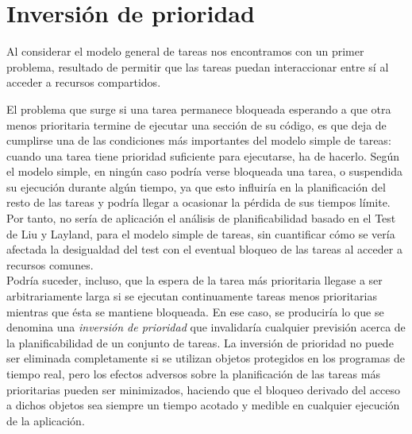 \section{Inversión de prioridad}
Al considerar el modelo general de tareas nos encontramos con un primer problema, resultado de permitir que las tareas puedan interaccionar entre sí al acceder a recursos compartidos.

El problema que surge si una tarea permanece bloqueada esperando a que otra menos prioritaria termine de ejecutar una sección de su código, es que deja de cumplirse una de las condiciones más importantes del modelo simple de tareas: cuando una tarea tiene prioridad suficiente para ejecutarse, ha de hacerlo. Según el modelo simple, en ningún caso podría verse bloqueada una tarea, o suspendida su ejecución durante algún tiempo, ya que esto influiría en la planificación del resto de las tareas y podría llegar a ocasionar la pérdida de sus tiempos límite. Por tanto, no sería de aplicación el análisis de planificabilidad basado en el Test de Liu y Layland, para el modelo simple de tareas, sin cuantificar cómo se vería afectada la desigualdad del test con el eventual bloqueo de las tareas al acceder a recursos comunes.\\

Podría suceder, incluso, que la espera de la tarea más prioritaria llegase a ser arbitrariamente larga si se ejecutan continuamente tareas menos prioritarias mientras que ésta se mantiene bloqueada. En ese caso, se produciría lo que se denomina una \textit{inversión de prioridad} que invalidaría cualquier previsión acerca de la planificabilidad de un conjunto de tareas. La inversión de prioridad no puede ser eliminada completamente si se utilizan objetos protegidos en los programas de tiempo real, pero los efectos adversos sobre la planificación de las tareas más prioritarias pueden ser minimizados, haciendo que el bloqueo derivado del acceso a dichos objetos sea siempre un tiempo acotado y medible en cualquier ejecución de la aplicación.

